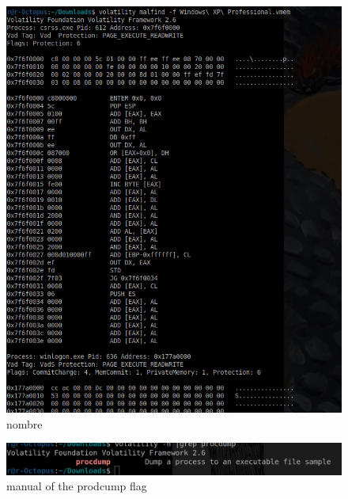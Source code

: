 \documentclass[10pt,a4paper]{article} %
\begin{document}
    \begin{figure}[h!]
        \centering
        \includegraphics[width=0.8\linewidth]{malfind.png}
        \caption{nombre}
        \label{fig}
    \end{figure}

    \begin{figure}[h!]
        \centering
        \includegraphics[width=0.8\linewidth]{procdumpin.png}
        \caption{manual of the prodcump flag}
        \label{fig}
    \end{figure}



















    \nocite{*}
    
    
\end{document}
